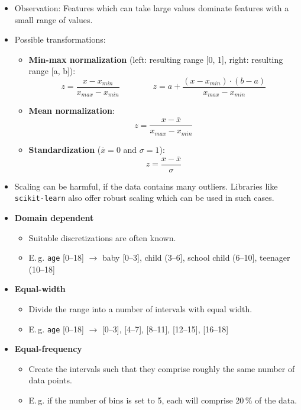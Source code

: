 \begin{frame}
	\begin{itemize}
		\item Observation: Features which can take large values dominate features with a small range of values.
		\item Possible transformations:
		\begin{itemize}
			\item \textbf{Min-max normalization} (left: resulting range [0, 1], right: resulting range [a, b]):
			\begin{equation}
				z  = \frac{x - x_{min}}{x_{max} - x_{min}} \qquad\qquad z = a + \frac{(x - x_{min}) \cdot (b - a)}{x_{max} - x_{min}}
			\end{equation}
			\item \textbf{Mean normalization}:
			\begin{equation}
				z = \frac{x - \overline{x}}{x_{max} - x_{min}}
			\end{equation}
			\item \textbf{Standardization} ($\overline{x} = 0$ and $\sigma = 1$):
			\begin{equation}
				z = \frac{x - \overline{x}}{\sigma}
			\end{equation}
		\end{itemize}
		\item Scaling can be harmful, if the data contains many outliers. Libraries like \texttt{scikit-learn} also offer robust scaling
			which can be used in such cases.
	\end{itemize}
\end{frame}


\begin{frame}
	\begin{itemize}
		\item \textbf{Domain dependent}
		\begin{itemize}
			\item Suitable discretizations are often known.
			\item E.\,g. \texttt{age} [0--18] $\longrightarrow$ baby [0--3], child (3--6], school child (6--10], teenager (10--18] 
		\end{itemize}
		\item \textbf{Equal-width}
		\begin{itemize}
			\item Divide the range into a number of intervals with equal width.
			\item E.\,g. \texttt{age} [0--18] $\longrightarrow$ [0--3], [4--7], [8--11], [12--15], [16--18] 
		\end{itemize}
		\item \textbf{Equal-frequency}
		\begin{itemize}
			\item Create the intervals such that they comprise roughly the same number of data points.
			\item E.\,g. if the number of bins is set to 5, each will comprise 20\,\% of the data.
		\end{itemize}
	\end{itemize}
\end{frame}


